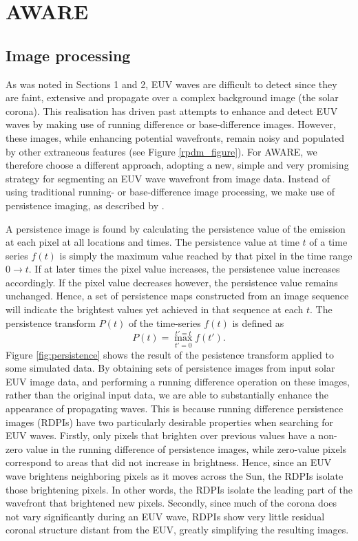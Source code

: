 \section{AWARE}\label{sec:aware}

\subsection{Image processing}
\label{img_proc}

As was noted in Sections 1 and 2, EUV waves are difficult to detect
since they are faint, extensive and propagate over a complex
background image (the solar corona). This realisation has driven past
attempts to enhance and detect EUV waves by making use of running
difference or base-difference images. However, these images, while
enhancing potential wavefronts, remain noisy and populated by other
extraneous features (see Figure \ref{rpdm_figure}). For AWARE, we therefore choose a different
approach, adopting a new, simple and very promising strategy for
segmenting an EUV wave wavefront from image data. Instead of using
traditional running- or base-difference image processing, we make use
of persistence imaging, as described by \citet{2014AAS...22421838T}.

A persistence image is found by calculating the persistence value of
the emission at each pixel at all locations and times.  The
persistence value at time $t$ of a time series $f(t)$ is simply the
maximum value reached by that pixel in the time range $0\rightarrow
t$.  If at later times the pixel value increases, the persistence
value increases accordingly. If the pixel value decreases however, the
persistence value remains unchanged. Hence, a set of persistence maps
constructed from an image sequence will indicate the brightest values
yet achieved in that sequence at each $t$.  The persistence transform
$P(t)$ of the time-series $f(t)$ is defined as
\begin{equation}
\label{eqn:persisttransform}
P(t) = \max_{t'=0}^{t'=t}f(t').
\end{equation}
Figure \ref{fig:persistence} shows the result of the pesistence
transform applied to some simulated data.  By obtaining sets of
persistence images from input solar EUV image data, and performing a
running difference operation on these images, rather than the original
input data, we are able to substantially enhance the appearance of
propagating waves. This is because running difference persistence images (RDPIs) have two particularly desirable
properties when searching for EUV waves.  Firstly, only pixels that
brighten over previous values have a non-zero value in the running
difference of persistence images, while zero-value pixels correspond
to areas that did not increase in brightness. Hence, since an EUV wave
brightens neighboring pixels as it moves across the Sun, the RDPIs
isolate those brightening pixels.  In other words, the RDPIs isolate
the leading part of the wavefront that brightened new pixels.
Secondly, since much of the corona does not vary significantly during
an EUV wave, RDPIs show very little residual coronal structure distant
from the EUV, greatly simplifying the resulting images.

